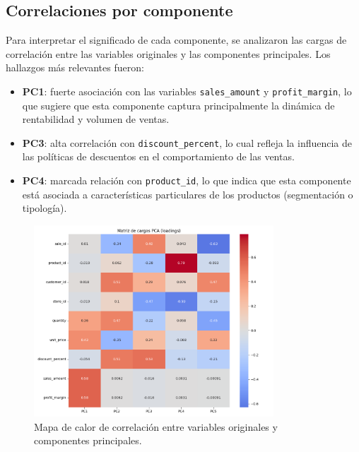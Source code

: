 \documentclass[12pt,a4paper]{article}
\begin{document}
\subsection{Correlaciones por componente}
Para interpretar el significado de cada componente, se analizaron las cargas de 
correlación entre las variables originales y las componentes principales. Los 
hallazgos más relevantes fueron:
\begin{itemize}
    \item \textbf{PC1}: fuerte asociación con las variables \texttt{sales\_amount} y 
    \texttt{profit\_margin}, lo que sugiere que esta componente captura principalmente 
    la dinámica de rentabilidad y volumen de ventas.
    \item \textbf{PC3}: alta correlación con \texttt{discount\_percent}, lo cual 
    refleja la influencia de las políticas de descuentos en el comportamiento de las 
    ventas.
    \item \textbf{PC4}: marcada relación con \texttt{product\_id}, lo que indica que 
    esta componente está asociada a características particulares de los productos 
    (segmentación o tipología).
\end{itemize}

\begin{figure}[H]
    \centering
    \includegraphics[width=0.8\textwidth]{figures/pca_loadings_heatmap.png}
    \caption{Mapa de calor de correlación entre variables originales y componentes principales.}
    \label{fig:pca_heatmap}
\end{figure}
\end{document}

